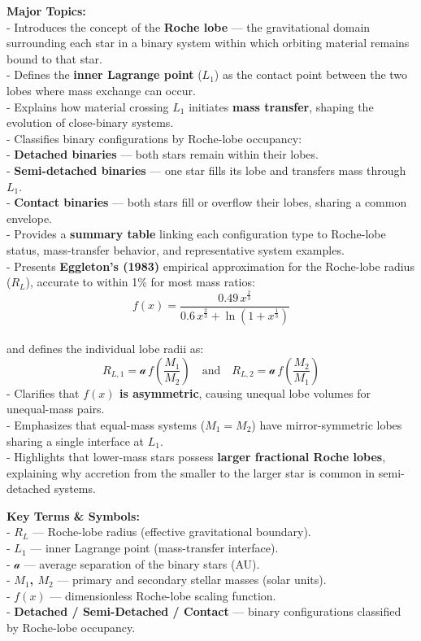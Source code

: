 \documentclass[
  letterpaper,
]{book}
\begin{document}
\textbf{Major Topics:}\\
- Introduces the concept of the \textbf{Roche lobe} --- the
gravitational domain surrounding each star in a binary system within
which orbiting material remains bound to that star.\\
- Defines the \textbf{inner Lagrange point} (\(L_1\)) as the contact
point between the two lobes where mass exchange can occur.\\
- Explains how material crossing \(L_1\) initiates \textbf{mass
transfer}, shaping the evolution of close-binary systems.\\
- Classifies binary configurations by Roche-lobe occupancy:\\
- \textbf{Detached binaries} --- both stars remain within their lobes.\\
- \textbf{Semi-detached binaries} --- one star fills its lobe and
transfers mass through \(L_1\).\\
- \textbf{Contact binaries} --- both stars fill or overflow their lobes,
sharing a common envelope.\\
- Provides a \textbf{summary table} linking each configuration type to
Roche-lobe status, mass-transfer behavior, and representative system
examples.\\
- Presents \textbf{Eggleton's (1983)} empirical approximation for the
Roche-lobe radius (\(R_L\)), accurate to within 1\% for most mass
ratios:\\
\[
  f(x) =
  \frac{0.49\,x^{\tfrac{2}{3}}}
       {0.6\,x^{\tfrac{2}{3}} + \ln\!\left(1 + x^{\tfrac{1}{3}}\right)}
  \]\\
and defines the individual lobe radii as:\\
\[
  R_{L,1} = \mathcal{a}\,f\!\left(\frac{M_1}{M_2}\right)
  \quad\text{and}\quad
  R_{L,2} = \mathcal{a}\,f\!\left(\frac{M_2}{M_1}\right)
  \] - Clarifies that \textbf{\(f(x)\) is asymmetric}, causing unequal
lobe volumes for unequal-mass pairs.\\
- Emphasizes that equal-mass systems (\(M_1 = M_2\)) have
mirror-symmetric lobes sharing a single interface at \(L_1\).\\
- Highlights that lower-mass stars possess \textbf{larger fractional
Roche lobes}, explaining why accretion from the smaller to the larger
star is common in semi-detached systems.

\textbf{Key Terms \& Symbols:}\\
- \textbf{\(R_L\)} --- Roche-lobe radius (effective gravitational
boundary).\\
- \textbf{\(L_1\)} --- inner Lagrange point (mass-transfer interface).\\
- \textbf{\(\mathcal{a}\)} --- average separation of the binary stars
(AU).\\
- \textbf{\(M_1\), \(M_2\)} --- primary and secondary stellar masses
(solar units).\\
- \textbf{\(f(x)\)} --- dimensionless Roche-lobe scaling function.\\
- \textbf{Detached / Semi-Detached / Contact} --- binary configurations
classified by Roche-lobe occupancy.
\end{document}
